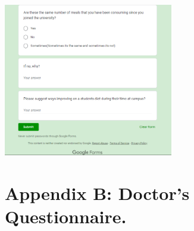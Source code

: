 \documentclass{article}
\begin{document}
\begin{center}
\includegraphics[width=280px]{images/questionnaire4.PNG} 
\end{center}

\newpage
\appendix
\renewcommand{\thesection}{} %
\section{Appendix B: Doctor's Questionnaire.}
\end{document}
